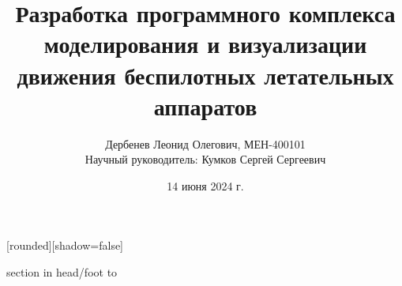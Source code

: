 \documentclass[10pt,t]{beamer}
\begin{document}


[rounded][shadow=false]



\beamertemplatenavigationsymbolsempty





\title[Разработка программного комплекса моделирования и визуализации движения беспилотных летательных аппартов]{Разработка программного комплекса моделирования и визуализации движения беспилотных летательных аппаратов}

\author{\large Дербенев Леонид Олегович, МЕН-400101\\[2ex]
Научный руководитель: Кумков Сергей Сергеевич
}


\date{14 июня 2024 г.}

\maketitle



{%
\begin{beamercolorbox}{section in head/foot}
  \vskip2pt%
  \hbox to \paperwidth{\insertnavigation{0.95\paperwidth} \hfill%
    {\scriptsize \bfseries \insertframenumber}\hspace*{3mm}}%
  \vskip2pt
\end{beamercolorbox}%
}
\end{document}
